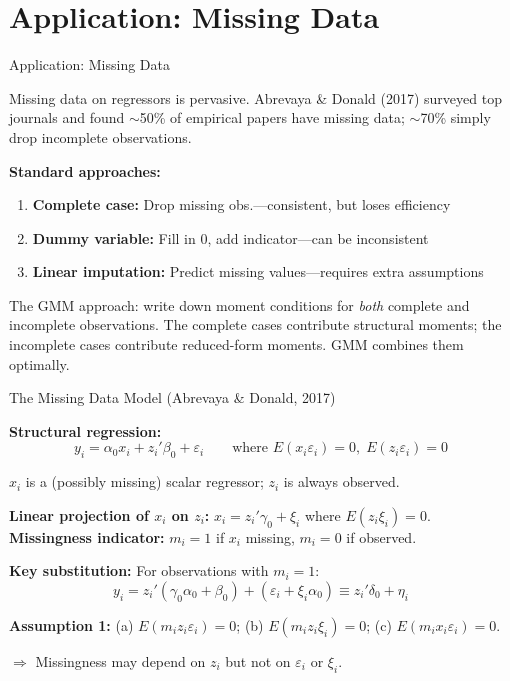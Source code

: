 \documentclass[aspectratio=169, handout, t]{beamer}
\numberwithin{equation}{section}
\begin{document}
\section{Application: Missing Data}

\begin{frame}{Application: Missing Data}

Missing data on regressors is pervasive.  Abrevaya \& Donald (2017) surveyed top journals and found $\sim$50\% of empirical papers have missing data; $\sim$70\% simply drop incomplete observations.

\medskip\pause
\textbf{Standard approaches:}
\begin{enumerate}
\item \textbf{Complete case:} Drop missing obs.---consistent, but loses efficiency
\item \textbf{Dummy variable:} Fill in 0, add indicator---\alert{can be inconsistent}
\item \textbf{Linear imputation:} Predict missing values---requires extra assumptions
\end{enumerate}

\medskip\pause
The GMM approach: write down moment conditions for \emph{both} complete and incomplete observations.  The complete cases contribute structural moments; the incomplete cases contribute reduced-form moments.  GMM combines them optimally.

\end{frame}

\begin{frame}{The Missing Data Model (Abrevaya \& Donald, 2017)}

\textbf{Structural regression:}
$$y_i = \alpha_0 x_i + z_i'\beta_0 + \varepsilon_i \qquad \text{where } E(x_i\varepsilon_i) = 0,\; E(z_i\varepsilon_i) = 0$$

$x_i$ is a (possibly missing) scalar regressor; $z_i$ is always observed.

\medskip
\textbf{Linear projection of $x_i$ on $z_i$:}
$x_i = z_i'\gamma_0 + \xi_i$ where $E(z_i\xi_i) = 0$.
\textbf{Missingness indicator:} $m_i = 1$ if $x_i$ missing, $m_i = 0$ if observed.

\medskip
\textbf{Key substitution:} For observations with $m_i = 1$:
$$y_i = z_i'(\gamma_0\alpha_0 + \beta_0) + (\varepsilon_i + \xi_i\alpha_0) \equiv z_i'\delta_0 + \eta_i$$

\medskip
\textbf{Assumption 1:} (a) $E(m_iz_i\varepsilon_i) = 0$; (b) $E(m_iz_i\xi_i) = 0$; (c) $E(m_ix_i\varepsilon_i) = 0$.

$\Rightarrow$ Missingness may depend on $z_i$ but not on $\varepsilon_i$ or $\xi_i$.
\end{frame}
\end{document}
